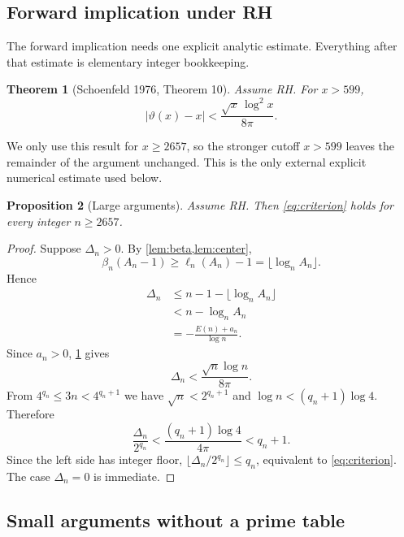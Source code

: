 \documentclass[10pt]{article}
\newtheorem{theorem}{Theorem}[section]
\newtheorem{proposition}[theorem]{Proposition}
\theoremstyle{definition}
\newcommand{\tht}{\vartheta}
\begin{document}
\subsection{Forward implication under RH}

The forward implication needs one explicit analytic estimate. Everything after
that estimate is elementary integer bookkeeping.

\begin{theorem}[Schoenfeld 1976, Theorem 10]
\label{thm:Schoenfeld}
Assume RH. For $x>599$,
\begin{equation}
\label{eq:Schoenfeld}
|\tht(x)-x|< \frac{\sqrt{x}\,\log^2x}{8\pi}.
\end{equation}
\end{theorem}

We only use this result for $x\ge2657$, so the stronger cutoff $x>599$ leaves
the remainder of the argument unchanged. This is the only external explicit
numerical estimate used below.

\begin{proposition}[Large arguments]
\label{prop:forwardlarge}
Assume RH. Then \eqref{eq:criterion} holds for every integer $n\ge2657$.
\end{proposition}

\begin{proof}
Suppose $\Delta_n>0$. By \cref{lem:beta,lem:center},
\[
\beta_n(A_n-1)\ge \ell_n(A_n)-1=\lfloor\log_n A_n\rfloor.
\]
Hence
\begin{align*}
\Delta_n
&\le n-1-\lfloor\log_n A_n\rfloor\\
&<n-\log_n A_n\\
&=-\frac{E(n)+a_n}{\log n}.
\end{align*}
Since $a_n>0$, \cref{thm:Schoenfeld} gives
\begin{equation}
\label{eq:deltaRH}
\Delta_n<\frac{\sqrt n\log n}{8\pi}.
\end{equation}
From $4^{q_n}\le3n<4^{q_n+1}$ we have $\sqrt n<2^{q_n+1}$ and $\log
n<(q_n+1)\log4$. Therefore
\[
\frac{\Delta_n}{2^{q_n}}
<\frac{(q_n+1)\log4}{4\pi}<q_n+1.
\]
Since the left side has integer floor, $\lfloor\Delta_n/2^{q_n}\rfloor\le
q_n$, equivalent to \eqref{eq:criterion}. The case $\Delta_n=0$ is immediate.
\end{proof}

\subsection{Small arguments without a prime table}
\end{document}
